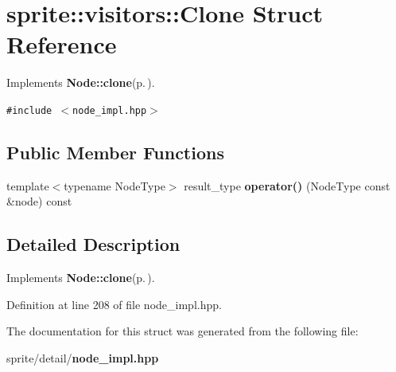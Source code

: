 \section{sprite::visitors::Clone Struct Reference}
\label{structsprite_1_1visitors_1_1Clone}
Implements {\bf Node::clone}{\rm (p.\,\pageref{structsprite_1_1Node_a4})}.  


{\tt \#include $<$node\_\-impl.hpp$>$}

\subsection*{Public Member Functions}
\begin{CompactItemize}
\item 
template$<$typename Node\-Type$>$ result\_\-type {\bf operator()} (Node\-Type const \&node) const \label{structsprite_1_1visitors_1_1Clone_a0}

\end{CompactItemize}


\subsection{Detailed Description}
Implements {\bf Node::clone}{\rm (p.\,\pageref{structsprite_1_1Node_a4})}. 



Definition at line 208 of file node\_\-impl.hpp.

The documentation for this struct was generated from the following file:\begin{CompactItemize}
\item 
sprite/detail/{\bf node\_\-impl.hpp}\end{CompactItemize}

